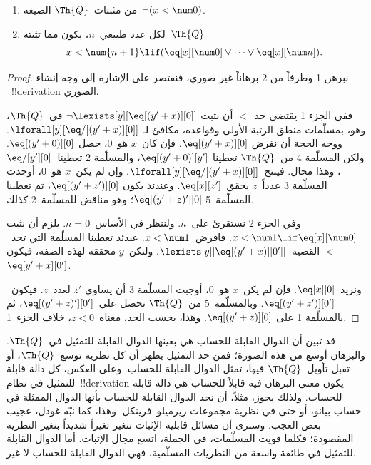 \documentclass[../../../include/open-logic-section]{subfiles}
\begin{document}
\begin{lem}
\begin{enumerate}
\item من مثبتات~$\Th{Q}$ الصيغة~$\lnot (x < \num 0)$.
\item لكل عدد طبيعي~$n$، يكون مما تثبته~$\Th{Q}$
\[
x < \num {n+1} \lif (\eq[x][\num 0] \lor \dots \lor \eq[x][\num n]).
\]
\end{enumerate}
\end{lem}

\begin{proof}
نبرهن 1 وطرفاً من 2 برهاناً غير صوري، فنقتصر على الإشارة إلى وجه إنشاء
~!!{derivation} الصوري.

ففي الجزء 1 يقتضي حد~$<$ أن نثبت
$\lnot \lexists[y][\eq[(y'+x)][0]]$ في~$\Th{Q}$، وهو، بمسلّمات منطق
الرتبة الأولى وقواعده، مكافئ لـ
$\lforall[y][\eq/[(y' + x)][0]]$. ووجه الحجة أن نفرض
$\eq[(y'+x)][0]$. فإن كان~$x$ هو~$0$، حصل
$\eq[(y' + 0)][0]$. ولكن المسلّمة 4 من~$\Th{Q}$ تعطينا
$\eq[(y' + 0)][y']$، والمسلّمة 2 تعطينا~$\eq/[y'][0]$، وهذا محال.
فينتج~$\lforall[y][\eq/[(y' +x)][0]]$. وإن لم يكن~$x$ هو~$0$، أوجدت
المسلّمة 3 عدداً~$z$ يحقق~$\eq[x][z']$. وعندئذ يكون
$\eq[(y' + z')][0]$، ثم تعطينا المسلّمة~5
$\eq[(y' + z)'][0]$؛ وهو مناقض للمسلّمة~2 كذلك.

وفي الجزء 2 نستقرئ على~$n$. ولننظر في الأساس~$n =0$. يلزم أن نثبت
$x < \num 1 \lif \eq[x][\num 0]$. فافرض~$x < \num 1$. عندئذ تعطينا
المسلّمة التي تحد~$<$ القضية~$\lexists[y][\eq[(y'+x)][0']]$. ولتكن~$y$
محققة لهذه الصفة، فيكون~$\eq[y'+x][0']$.

ونريد~$\eq[x][0]$. فإن لم يكن~$x$ هو~$0$، أوجبت المسلّمة 3 أن يساوي
$z'$ لعدد~$z$. فيكون~$\eq[(y' + z')][0']$. وبالمسلّمة~5 من~$\Th{Q}$
نحصل على~$\eq[(y'+z)'][0']$، ثم بالمسلّمة 1 على
$\eq[(y' + z)][0]$. وهذا، بحسب الحد، معناه~$z < 0$، خلاف الجزء~1.
\end{proof}

\begin{explain}
قد تبين أن الدوال القابلة للحساب هي بعينها الدوال القابلة للتمثيل
في~$\Th{Q}$. والبرهان أوسع من هذه الصورة؛ فمن حد التمثيل يظهر أن كل نظرية
توسع~$\Th{Q}$، أو تقبل تأويل~$\Th{Q}$ فيها، تمثل الدوال القابلة للحساب.
وعلى العكس، كل دالة قابلة للتمثيل في نظام~!!{derivation} يكون معنى البرهان
فيه قابلاً للحساب هي دالة قابلة للحساب. ولذلك يجوز، مثلاً، أن نحد الدوال
القابلة للحساب بأنها الدوال الممثلة في حساب بيانو، أو حتى في نظرية مجموعات
زيرميلو--فرينكل. وهذا، كما نبّه غودل، عجيب بعض العجب. وسنرى أن مسائل
قابلية الإثبات تتغير تغيراً شديداً بتغير النظرية المقصودة؛ فكلما قويت
المسلّمات، في الجملة، اتسع مجال الإثبات. أما الدوال القابلة للتمثيل في
طائفة واسعة من النظريات المسلّمية، فهي الدوال القابلة للحساب لا غير.
\end{explain}
\end{document}
